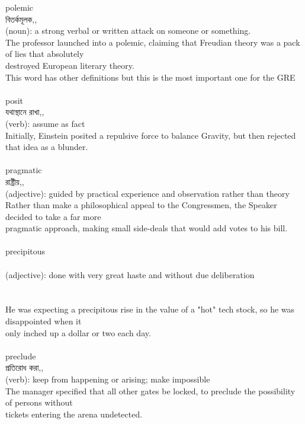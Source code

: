\documentclass{article}
\begin{document}
{polemic}\\
{বিতর্কমূলক,,}\\
{(noun): a strong verbal or written attack on someone or something.\\The professor launched into a polemic, claiming that Freudian theory was a pack of lies that absolutely\\destroyed European literary theory.\\This word has other definitions but this is the most important one for the GRE\\}\\
{posit}\\
{যথাস্থানে রাখা,,}\\
{(verb): assume as fact\\Initially, Einstein posited a repulsive force to balance Gravity, but then rejected that idea as a blunder.\\}\\
{pragmatic}\\
{রাষ্ট্রীয়,,}\\
{(adjective): guided by practical experience and observation rather than theory\\Rather than make a philosophical appeal to the Congressmen, the Speaker decided to take a far more\\pragmatic approach, making small side-deals that would add votes to his bill.\\}\\
{precipitous}\\
{}\\
{(adjective): done with very great haste and without due deliberation\\\\                                                                               \\He was expecting a precipitous rise in the value of a "hot" tech stock, so he was disappointed when it\\only inched up a dollar or two each day.\\}\\
{preclude}\\
{প্রতিরোধ করা,,}\\
{(verb): keep from happening or arising; make impossible\\The manager specified that all other gates be locked, to preclude the possibility of persons without\\tickets entering the arena undetected.\\}\\
\end{document}
